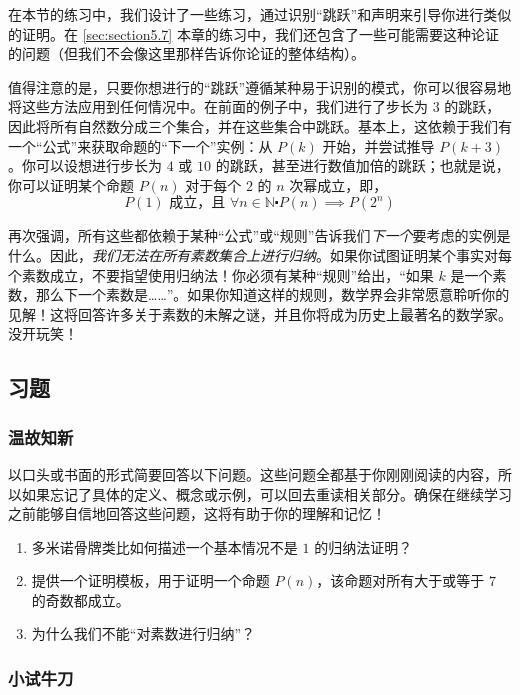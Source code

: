 在本节的练习中，我们设计了一些练习，通过识别``跳跃''和声明来引导你进行类似的证明。在 \ref{sec:section5.7} 本章的练习中，我们还包含了一些可能需要这种论证的问题（但我们不会像这里那样告诉你论证的整体结构）。

值得注意的是，只要你想进行的``跳跃''遵循某种易于识别的模式，你可以很容易地将这些方法应用到任何情况中。在前面的例子中，我们进行了步长为 $3$ 的跳跃，因此将所有自然数分成三个集合，并在这些集合中跳跃。基本上，这依赖于我们有一个``公式''来获取命题的``下一个''实例：从 $P(k)$ 开始，并尝试推导 $P(k + 3)$。你可以设想进行步长为 $4$ 或 $10$ 的跳跃，甚至进行数值加倍的跳跃；也就是说，你可以证明某个命题 $P(n)$ 对于每个 $2$ 的 $n$ 次幂成立，即，
\[P(1) \text{ 成立，且 } \forall n \in \mathbb{N} \centerdot P(n) \implies P(2^n)\]

再次强调，所有这些都依赖于某种``公式''或``规则''告诉我们\emph{下一个}要考虑的实例是什么。因此，\emph{我们无法在所有素数集合上进行归纳}。如果你试图证明某个事实对每个素数成立，不要指望使用归纳法！你必须有某种``规则''给出，``如果 $k$ 是一个素数，那么下一个素数是……''。如果你知道这样的规则，数学界会非常愿意聆听你的见解！这将回答许多关于素数的未解之谜，并且你将成为历史上最著名的数学家。没开玩笑！

\subsection{习题}\label{sec:section5.3.4}

\subsubsection*{温故知新}

以口头或书面的形式简要回答以下问题。这些问题全都基于你刚刚阅读的内容，所以如果忘记了具体的定义、概念或示例，可以回去重读相关部分。确保在继续学习之前能够自信地回答这些问题，这将有助于你的理解和记忆！

\begin{enumerate}[label=(\arabic*)]
    \item 多米诺骨牌类比如何描述一个基本情况不是 $1$ 的归纳法证明？
    \item 提供一个证明模板，用于证明一个命题 $P(n)$，该命题对所有大于或等于 $7$ 的奇数都成立。
    \item 为什么我们不能``对素数进行归纳''？
\end{enumerate}

\subsubsection*{小试牛刀}

